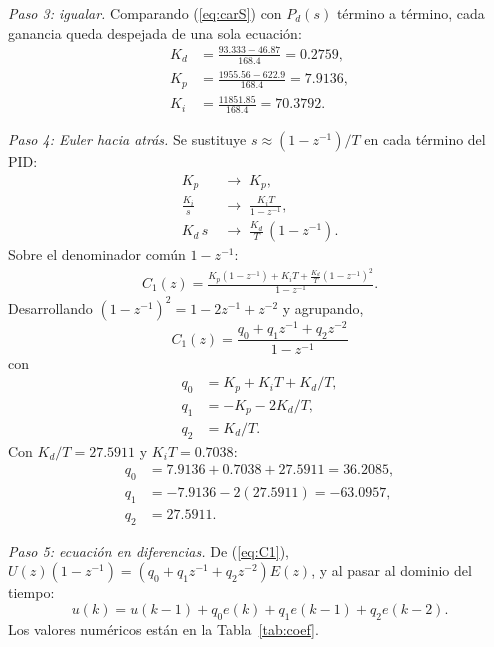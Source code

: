 \documentclass[conference]{IEEEtran}
\begin{document}
\textit{Paso 3: igualar.} Comparando (\ref{eq:carS}) con $P_d(s)$ término a
término, cada ganancia queda despejada de una sola ecuación:
\begin{align*}
  K_d &= \frac{93.333 - 46.87}{168.4} = 0.2759,\\
  K_p &= \frac{1955.56 - 622.9}{168.4} = 7.9136,\\
  K_i &= \frac{11851.85}{168.4} = 70.3792.
\end{align*}

\textit{Paso 4: Euler hacia atrás.} Se sustituye $s \approx (1-z^{-1})/T$ en
cada término del PID:
\begin{align*}
  K_p &\;\rightarrow\; K_p,\\
  \frac{K_i}{s} &\;\rightarrow\; \frac{K_iT}{1-z^{-1}},\\
  K_d\,s &\;\rightarrow\; \frac{K_d}{T}\,(1-z^{-1}).
\end{align*}
Sobre el denominador común $1-z^{-1}$:
\begin{align*}
  C_1(z) = \frac{K_p(1-z^{-1}) + K_iT + \frac{K_d}{T}(1-z^{-1})^2}{1-z^{-1}}.
\end{align*}
Desarrollando $(1-z^{-1})^2 = 1 - 2z^{-1} + z^{-2}$ y agrupando,
\begin{equation}
  C_1(z) = \frac{q_0 + q_1z^{-1} + q_2z^{-2}}{1 - z^{-1}}
  \label{eq:C1}
\end{equation}
con
\begin{align*}
  q_0 &= K_p + K_iT + K_d/T,\\
  q_1 &= -K_p - 2K_d/T,\\
  q_2 &= K_d/T.
\end{align*}
Con $K_d/T = 27.5911$ y $K_iT = 0.7038$:
\begin{align*}
  q_0 &= 7.9136 + 0.7038 + 27.5911 = 36.2085,\\
  q_1 &= -7.9136 - 2(27.5911) = -63.0957,\\
  q_2 &= 27.5911.
\end{align*}

\textit{Paso 5: ecuación en diferencias.} De (\ref{eq:C1}),
$U(z)(1-z^{-1}) = (q_0 + q_1z^{-1} + q_2z^{-2})E(z)$, y al pasar al dominio
del tiempo:
\begin{equation}
  u(k) = u(k-1) + q_0e(k) + q_1e(k-1) + q_2e(k-2).
  \label{eq:ukcd}
\end{equation}
Los valores numéricos están en la Tabla~\ref{tab:coef}.
\end{document}
